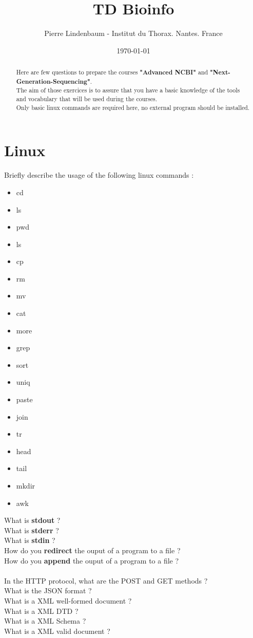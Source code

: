 \documentclass{article}
\title{TD Bioinfo}
\author{Pierre Lindenbaum - Institut du Thorax. Nantes. France}
\date{\today}
\begin{document}
\maketitle
\begin{abstract}
Here are few questions to prepare the courses \textbf{"Advanced NCBI"} and \textbf{"Next-Generation-Sequencing"}.\\
The aim of those exercices is to assure that you have a basic knowledge of the tools and vocabulary that will be used during the courses.\\
Only basic linux commands are required here, no external program should be installed.
\end{abstract}

\section{Linux}
Briefly describe the usage of the following linux commands :
\begin{itemize}
\item cd
\item ls
\item pwd
\item ls
\item cp
\item rm
\item mv
\item cat
\item more
\item grep
\item sort
\item uniq
\item paste
\item join
\item tr
\item head
\item tail
\item mkdir
\item awk
\end{itemize}
\noindent
What is 	\textbf{stdout} ? \\
What is 	\textbf{stderr} ?\\
What is 	\textbf{stdin} ?\\
How do you 	\textbf{redirect} the ouput of a program to a file ?\\
How do you 	\textbf{append} the ouput of a program to a file ?\\
\\
In the HTTP protocol, what are the POST and GET methods ?\\
What is the JSON format ?\\
What is a XML well-formed document ?\\
What is a XML DTD ?\\
What is a XML Schema ?\\
What is a XML valid document ?\\
\end{document}
